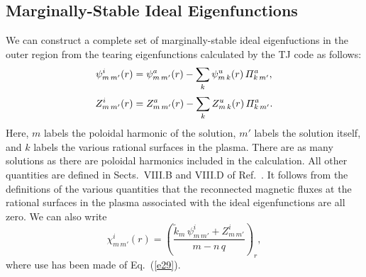 \documentclass[12pt,prb,aps]{revtex4-1}
\begin{document}
 \subsection{Marginally-Stable Ideal Eigenfunctions}\label{sideal}
We can construct a complete set of  marginally-stable ideal eigenfuctions in the outer region from the tearing eigenfunctions calculated by the TJ code as follows:
\begin{align}
\psi_{m\,m'}^i(r)&= \psi_{m\,m'}^a(r)-\sum_{k}\psi_{m\,k}^u(r)\,{\mit\Pi}_{k\,m'}^a,\\[0.5ex]
Z_{m\,m'}^i(r)&= Z_{m\,m'}^a(r)-\sum_{k}Z_{m\,k}^u(r)\,{\mit\Pi}_{k\,m'}^a.
\end{align}
 Here, $m$ labels the poloidal harmonic of the solution,  $m'$ labels the solution itself, and $k$ labels the various rational surfaces in the plasma. There are as many solutions as there are poloidal harmonics included in the calculation. All other quantities are defined in Sects.~VIII.B and VIII.D of Ref.~. 
 It follows
from the definitions of the various quantities that the reconnected magnetic  fluxes at the rational surfaces in the plasma
associated with the ideal eigenfunctions are all zero. We can also write
\begin{equation}\label{e39}
\chi^i_{m\,m'}(r) = \left(\frac{\tilde{k}_{m}\,\psi^i_{m\,m'}+Z_{m\,m'}^i}{m-n\,q}\right)_r,
\end{equation}
where use has been made of Eq.~(\ref{e29}).
\end{document}
